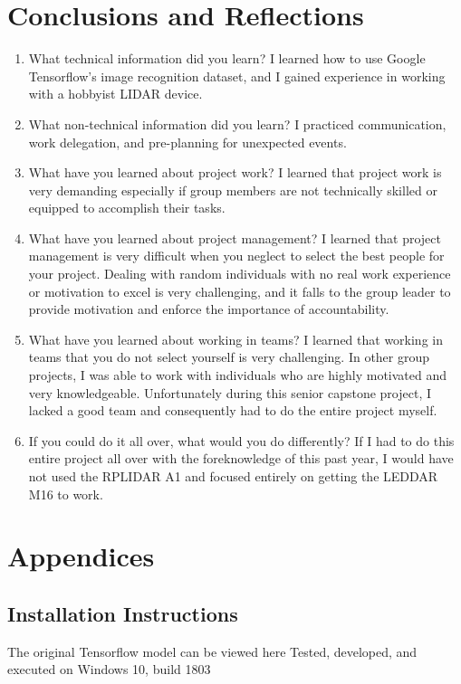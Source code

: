 \documentclass[onecolumn, draftclsnofoot,10pt, compsoc]{IEEEtran}
\begin{document}
\begin{singlespace}
\section{Conclusions and Reflections}
	\begin{enumerate}
    \item What technical information did you learn?
    	\subitem I learned how to use Google Tensorflow's image recognition dataset, and I gained experience in working with a hobbyist LIDAR device.
    \item What non-technical information did you learn?
    	\subitem I practiced communication, work delegation, and pre-planning for unexpected events.
    \item What have you learned about project work?
   		\subitem I learned that project work is very demanding especially if group members are not technically skilled or equipped to accomplish their tasks.
    \item What have you learned about project management?
    	\subitem I learned that project management is very difficult when you neglect to select the best people for your project.
    				Dealing with random individuals with no real work experience or motivation to excel is very challenging, and it falls to the group leader to provide motivation and enforce the importance of accountability. 
    \item What have you learned about working in teams?
    	\subitem I learned that working in teams that you do not select yourself is very challenging.
    				In other group projects, I was able to work with individuals who are highly motivated and very knowledgeable.
    				Unfortunately during this senior capstone project, I lacked a good team and consequently had to do the entire project myself.
    \item If you could do it all over, what would you do differently?
    	\subitem If I had to do this entire project all over with the foreknowledge of this past year, I would have not used the RPLIDAR A1 and focused entirely on getting the LEDDAR M16 to work.
    			
	\end{enumerate}

\section*{Appendices}
\renewcommand{\thesubsection}{\Alph{subsection}}

\subsection{Installation Instructions}
		The original Tensorflow model can be viewed here 
		Tested, developed, and executed on Windows 10, build 1803


\end{singlespace}
\end{document}
